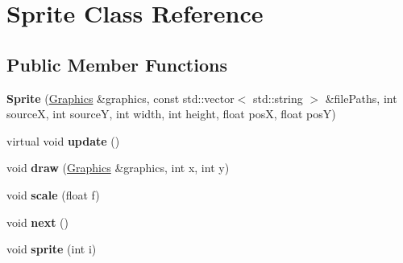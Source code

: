 \hypertarget{class_sprite}{}\section{Sprite Class Reference}
\label{class_sprite}
\subsection*{Public Member Functions}
\begin{DoxyCompactItemize}
\item 
\hypertarget{class_sprite_a84db5c503b2c70ce3613a68fb86eb2a1}{}\label{class_sprite_a84db5c503b2c70ce3613a68fb86eb2a1} 
{\bfseries Sprite} (\hyperlink{class_graphics}{Graphics} \&graphics, const std\+::vector$<$ std\+::string $>$ \&file\+Paths, int sourceX, int sourceY, int width, int height, float posX, float posY)
\item 
\hypertarget{class_sprite_a6d0f7e628b4ea8540697605fff906759}{}\label{class_sprite_a6d0f7e628b4ea8540697605fff906759} 
virtual void {\bfseries update} ()
\item 
\hypertarget{class_sprite_aab4e3857c6bd0d660f335bf72b70ee3b}{}\label{class_sprite_aab4e3857c6bd0d660f335bf72b70ee3b} 
void {\bfseries draw} (\hyperlink{class_graphics}{Graphics} \&graphics, int x, int y)
\item 
\hypertarget{class_sprite_a24033353c19a54257f7c7a0d0e5bf195}{}\label{class_sprite_a24033353c19a54257f7c7a0d0e5bf195} 
void {\bfseries scale} (float f)
\item 
\hypertarget{class_sprite_aae898a557919f1528a6762f56929a1ce}{}\label{class_sprite_aae898a557919f1528a6762f56929a1ce} 
void {\bfseries next} ()
\item 
\hypertarget{class_sprite_ad7b2e80ac2ea5ac3b2effe92a443cc80}{}\label{class_sprite_ad7b2e80ac2ea5ac3b2effe92a443cc80} 
void {\bfseries sprite} (int i)
\end{DoxyCompactItemize}
